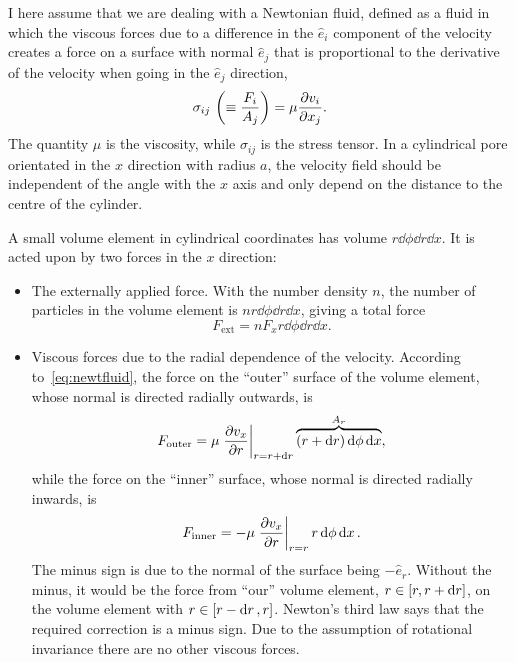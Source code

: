 \documentclass[11pt,british,a4paper]{report}
\begin{document}
I here assume that we are dealing with a Newtonian fluid, defined as a fluid in which the viscous forces due to a difference in the \(\hat{e}_i\) component of the velocity creates a force on a surface with normal \(\hat{e}_j\) that is proportional to the derivative of the velocity when going in the \(\hat{e}_j\) direction,
\begin{equation}
    \sigma_{ij}\ \qty(\equiv \frac{F_i}{A_j}) = \mu \pdv{v_i}{x_j}.\label{eq:newtfluid}
\end{equation}
The quantity \(\mu\) is the viscosity, while \(\sigma_{ij}\) is the stress tensor. In a cylindrical pore orientated in the \(x\) direction with radius \(a\), the velocity field should be independent of the angle with the \(x\) axis and only depend on the distance to the centre of the cylinder.

A small volume element in cylindrical coordinates has volume \(r\dd{\phi}\dd{r}\dd{x}\). It is acted upon by two forces in the \(x\) direction:
\begin{itemize}
    \item The externally applied force. With the number density \(n\), the number of particles in the volume element is \(nr\dd{\phi}\dd{r}\dd{x}\), giving a total force
        \begin{equation}
            F_{\text{ext}} = nF_xr\dd{\phi}\dd{r}\dd{x}.
        \end{equation}
    \item
        Viscous forces due to the radial dependence of the velocity. According to~\vref{eq:newtfluid}, the force on the ``outer'' surface of the volume element, whose normal is directed radially outwards, is
        \begin{equation}
            F_{\text{outer}} = \mu \eval{\pdv{v_x}{r}}_{r=r+\dd{r}}\overbrace{\qty(r+\dd{r})\dd{\phi}\dd{x}}^{A_r},
        \end{equation}
        while the force on the ``inner'' surface, whose normal is directed radially inwards, is
        \begin{equation}
            F_{\text{inner}} = -\mu \eval{\pdv{v_x}{r}}_{r=r}r\dd{\phi}\dd{x}.
        \end{equation}
        The minus sign is due to the normal of the surface being \(-\hat{e}_r\). Without the minus, it would be the force from ``our'' volume element, \(r\in\qty[r,r+\dd{r}]\), on the volume element with \(r\in\qty[r-\dd{r},r]\). Newton's third law says that the required correction is a minus sign. Due to the assumption of rotational invariance there are no other viscous forces.
\end{itemize}
\end{document}

